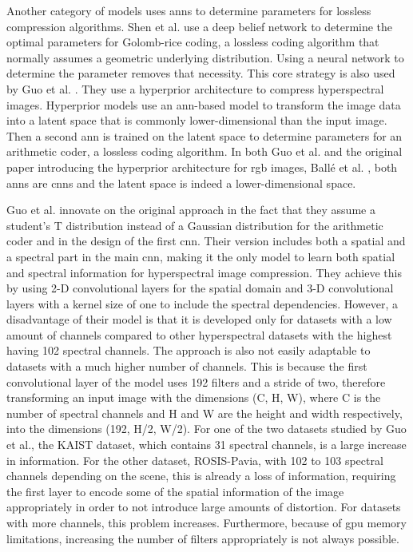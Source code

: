 Another category of models uses \acp{ann} to determine parameters for lossless compression algorithms. Shen et al. \citep{shen_golomb-rice_2017} use a deep belief network to determine the optimal parameters for Golomb-rice coding, a lossless coding algorithm that normally assumes a geometric underlying distribution. Using a neural network to determine the parameter removes that necessity.
This core strategy is also used by Guo et al. \citep{guo_learned_2021}. They use a hyperprior architecture to compress hyperspectral images. Hyperprior models use an \ac{ann}-based model to transform the image data into a latent space that is commonly lower-dimensional than the input image. Then a second \ac{ann} is trained on the latent space to determine parameters for an arithmetic coder, a lossless coding algorithm. In both Guo et al. and the original paper introducing the hyperprior architecture for \ac{rgb} images, Ballé et al. \citep{balle_end--end_2017}, both \acp{ann} are \acp{cnn} and the latent space is indeed a lower-dimensional space.

Guo et al. innovate on the original approach in the fact that they assume a student's T distribution instead of a Gaussian distribution for the arithmetic coder and in the design of the first \ac{cnn}. Their version includes both a spatial and a spectral part in the main \ac{cnn}, making it the only model to learn both spatial and spectral information for hyperspectral image compression. They achieve this by using 2-D convolutional layers for the spatial domain and 3-D convolutional layers with a kernel size of one to include the spectral dependencies. However, a disadvantage of their model is that it is developed only for datasets with a low amount of channels compared to other hyperspectral datasets with the highest having 102 spectral channels. The approach is also not easily adaptable to datasets with a much higher number of channels. This is because the first convolutional layer of the model uses 192 filters and a stride of two, therefore transforming an input image with the dimensions (C, H, W), where C is the number of spectral channels and H and W are the height and width respectively, into the dimensions (192, H/2, W/2). For one of the two datasets studied by Guo et al., the KAIST dataset, which contains 31 spectral channels, is a large increase in information. For the other dataset, ROSIS-Pavia, with 102 to 103 spectral channels depending on the scene, this is already a loss of information, requiring the first layer to encode some of the spatial information of the image appropriately in order to not introduce large amounts of distortion. For datasets with more channels, this problem increases. Furthermore, because of \ac{gpu} memory limitations, increasing the number of filters appropriately is not always possible.

